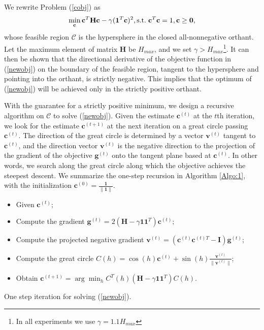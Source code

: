 \documentclass[10pt,twocolumn,letterpaper]{article}
\begin{document}
We rewrite Problem (\ref{cobj}) as 
\begin{equation}
\label{newobj}
\min_{\mathbf{c}}\mathbf{c}^{T}\mathbf{H}\mathbf{c}-\gamma(\mathbf{1}^{T}\mathbf{c})^2, \textup{s.t.}\hspace{3pt}\mathbf{c}^{T}\mathbf{c}=1, \mathbf{c}\ge\mathbf{0},
\end{equation}
whose feasible region $\mathcal{C}$ is the hypersphere in the closed all-nonnegative orthant. Let the maximum element of matrix $\mathbf{H}$ be $H_{max}$, and we set $\gamma>H_{max}$\footnote{In all experiments we use $\gamma=1.1H_{max}$}. It can then be shown that the directional derivative of the objective function in (\ref{newobj}) on the boundary of the feasible region, tangent to the hypersphere and pointing into the orthant, is strictly negative. This implies that the optimum of (\ref{newobj}) will be achieved only in the strictly positive orthant.

With the guarantee for a strictly positive minimum, we design a recursive algorithm on $\mathcal{C}$ to solve (\ref{newobj}). Given the estimate $\mathbf{c}^{(t)}$ at the $t$th iteration, we look for the estimate $\mathbf{c}^{(t+1)}$ at the next iteration on a great circle passing $\mathbf{c}^{(t)}$. The direction of the great circle is determined by a vector $\mathbf{v}^{(t)}$ tangent to $\mathbf{c}^{(t)}$, and the direction vector $\mathbf{v}^{(t)}$ is the negative direction to the projection of the gradient of the objective $\mathbf{g}^{(t)}$ onto the tangent plane based at $\mathbf{c}^{(t)}$. In other words, we search along the great circle along which the objective achieves the steepest descent. We summarize the one-step recursion in Algorithm \ref{Algo:1}, with the initialization $\mathbf{c}^{(0)}=\frac{\mathbf{1}}{\|\mathbf{1}\|}$.

\begin{algorithm}
\vspace{-5pt}
\small
\begin{itemize}
\item Given $\mathbf{c}^{(t)}$;
\item Compute the gradient $\mathbf{g}^{(t)}=2(\mathbf{H}-\gamma\mathbf{1}\mathbf{1}^{T})\mathbf{c}^{(t)}$;
\item Compute the projected negative gradient $\mathbf{v}^{(t)}=(\mathbf{c}^{(t)}\mathbf{c}^{(t)T}-\mathbf{I})\mathbf{g}^{(t)}$;
\item Compute the great circle $C(h)=\cos(h)\mathbf{c}^{(t)}+\sin(h)\frac{\mathbf{v}^{(t)}}{\|\mathbf{v}^{(t)}\|}$;
\item Obtain $\mathbf{c}^{(t+1)}=\arg\min_{h}C^{T}(h)(\mathbf{H}-\gamma\mathbf{1}\mathbf{1}^{T})C(h)$.
\end{itemize}
\vspace{-5pt}
\caption{\small One step iteration for  solving (\ref{newobj}).}
\label{Algo:1}
\end{algorithm}
\end{document}
